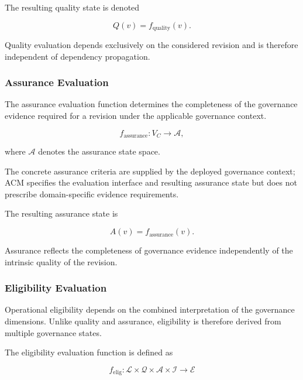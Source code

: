 \documentclass[10pt]{article}
\begin{document}
The resulting quality state is denoted

\begin{equation}
	Q(v)=f_{\mathrm{quality}}(v).
	\label{eq:quality_assignment}
\end{equation}

Quality evaluation depends exclusively on the considered revision and is therefore independent of dependency propagation.

\subsubsection{Assurance Evaluation}

The assurance evaluation function determines the completeness of the governance
evidence required for a revision under the applicable governance context.

\begin{equation}
	f_{\mathrm{assurance}} : V_C \rightarrow \mathcal{A},
	\label{eq:f_assurance}
\end{equation}

where $\mathcal{A}$ denotes the assurance state space.

The concrete assurance criteria are supplied by the deployed governance context; ACM specifies the evaluation interface and resulting assurance state but does not prescribe domain-specific evidence requirements.

The resulting assurance state is

\begin{equation}
	A(v)=f_{\mathrm{assurance}}(v).
	\label{eq:assurance_assignment}
\end{equation}

Assurance reflects the completeness of governance evidence independently of the intrinsic quality of the revision.

\subsubsection{Eligibility Evaluation}

Operational eligibility depends on the combined interpretation of the governance dimensions. Unlike quality and assurance, eligibility is therefore derived from multiple governance states.

The eligibility evaluation function is defined as

\begin{equation}
	\label{eq:eligibility_function}
	f_{\mathrm{elig}}
	:
	\mathcal{L}
	\times
	\mathcal{Q}
	\times
	\mathcal{A}
	\times
	\mathcal{I}
	\rightarrow
	\mathcal{E}
\end{equation}
\end{document}
